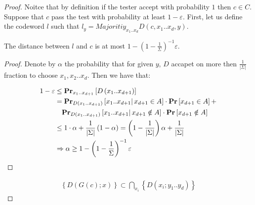 \begin{proof}
  Noitce that by definition if the tester accept with probability $1$ then $c \in C$. Suppose that $c$ pass the test with probability at least $1 - \varepsilon$. First, let us define the codeword $l$ such that $ l_{y} = Majoritiy_{x_1 .. x_{d}}D\left(c, x_{1}.. x_{d},y\right)$.

  \begin{claim} 
    The distance between $l$ and $c$ is at most $ 1- \left( 1 - \frac{1}{\Sigma} \right)^{-1}\varepsilon$.  
  \end{claim}
  \begin{proof} 
    Denote by $\alpha$ the probability that for given $y$, $D$ accapet on more then $\frac{1}{|\Sigma|}$ fraction to choose $x_{1},x_{2}..x_{d}$. 
    Then we have that:  
    
    \begin{equation*}
      \begin{split}
        1 - \varepsilon  & \le \prbm{ D\left( x_1 .. x_{d+1} \right) }{x_1 .. x_{d+1}}  \\
        & = \prbcprb{  D\left( x_1 .. x_{d+1} \right)}{ x_1 .. x_{d+1}  }{ x_{d+1} \in A } + \\
        & \ \ \ \prbcprb{ D\left( x_1 .. x_{d+1} \right)}{ x_1 .. x_{d+1}   }{ x_{d+1} \notin A } \\
        & \le 1 \cdot \alpha +  \frac{1}{|\Sigma|}  \left( 1 - \alpha \right) = \left( 1 - \frac{1}{|\Sigma|} \right) \alpha  + \frac{1}{|\Sigma|} \\
       & \Rightarrow \alpha \ge  1- \left( 1 - \frac{1}{\Sigma} \right)^{-1}\varepsilon
      \end{split}
    \end{equation*}
  \end{proof} 

  \begin{equation*}
    \begin{split}
      \left\{ D(G(c) ; x ) \right\} \subset \bigcap_{ x_{i} } \left\{ D\left( x_{i} ; y_{1} .. y_{d} \right)  \right\} 
    \end{split}
  \end{equation*}
\end{proof}


